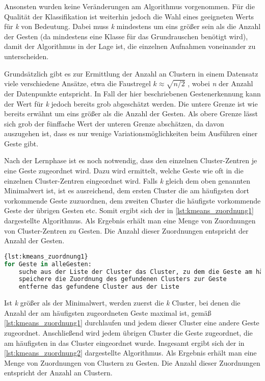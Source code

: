 Ansonsten wurden keine Veränderungen am Algorithmus vorgenommen.
Für die Qualität der Klassifikation ist weiterhin jedoch die Wahl eines geeigneten Werts für \emph{k} von Bedeutung. Dabei muss \emph{k} mindestens um eins größer sein als die Anzahl der Gesten (da mindestens eine Klasse für das Grundrauschen benötigt wird),
damit der Algorithmus in der Lage ist, die einzelnen Aufnahmen voneinander zu unterscheiden.  

Grundsätzlich gibt es zur Ermittlung der Anzahl an Clustern in einem Datensatz viele verschiedene Ansätze, etwa die Faustregel $k \approx \sqrt{n/2}$ \cite{WikipediaKMeansKValue}, wobei \emph{n} der Anzahl der Datenpunkte entspricht. In Fall der hier beschriebenen Gestenerkennung kann der Wert für \emph{k} jedoch bereits grob abgeschätzt werden. 
Die untere Grenze ist wie bereits erwähnt um eins größer als die Anzahl der Gesten.
Als obere Grenze lässt sich grob der fünffache Wert der unteren Grenze abschätzen, da davon auszugehen ist, dass es nur wenige Variationsmöglichkeiten beim Ausführen einer Geste gibt.

Nach der Lernphase ist es noch notwendig, dass den einzelnen Cluster-Zentren je eine Geste zugeordnet wird. Dazu wird ermittelt, welche Geste wie oft in die einzelnen Cluster-Zentren eingeordnet wird. Falls \emph{k} gleich dem oben genannten Minimalwert ist, ist es ausreichend, dem ersten Cluster die am häufigsten dort vorkommende Geste zuzuordnen, dem zweiten Cluster die häufigste vorkommende Geste der übrigen Gesten etc. 
Somit ergibt sich der in 
\autoref{lst:kmeans_zuordnung1}
dargestellte Algorithmus.
Als Ergebnis erhält man eine Menge von Zuordnungen von Cluster-Zentren zu Gesten. Die Anzahl dieser Zuordnungen entspricht der Anzahl der Gesten.

\begin{lstlisting}[language=Python,caption={Zuordnung von Cluster-Zentrum zu Geste, Variante 1},label={lst:kmeans_zuordnung1}]{lst:kmeans_zuordnung1}
for Geste in alleGesten:
    suche aus der Liste der Cluster das Cluster, zu dem die Geste am häufigsten zugeordnet wird
    speichere die Zuordnung des gefundenen Clusters zur Geste
    entferne das gefundene Cluster aus der Liste
\end{lstlisting}

Ist \emph{k} größer als der Minimalwert, werden zuerst die \emph{k} Cluster, bei denen die Anzahl der am häufigsten zugeordneten Geste maximal ist, gemäß 
\autoref{lst:kmeans_zuordnung1} durchlaufen und jedem dieser Cluster eine andere Geste zugeordnet. Anschließend wird jedem übrigen Cluster die Geste zugeordnet, die am häufigsten in das Cluster eingeordnet wurde.
Insgesamt ergibt sich der in \autoref{lst:kmeans_zuordnung2} dargestellte Algorithmus.  Als Ergebnis erhält man eine Menge von Zuordnungen von Clustern zu Gesten. Die Anzahl dieser Zuordnungen entspricht der Anzahl an Clustern.

